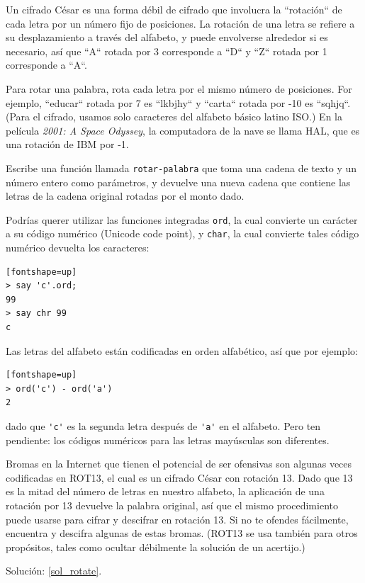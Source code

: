 \begin{exercise}

\label{rotate}
Un cifrado César es una forma débil de cifrado que involucra
la ``rotación`` de cada letra por un número fijo de posiciones.
La rotación de una letra se refiere a su desplazamiento a través
del alfabeto, y puede envolverse alrededor si es necesario, 
así que ``A`` rotada por 3 corresponde a ``D`` y ``Z`` rotada por
1 corresponde a ``A``.

Para rotar una palabra, rota cada letra por el mismo número de posiciones.
For ejemplo, ``educar`` rotada por 7 es ``lkbjhy`` y ``carta`` rotada por 
-10  es ``sqhjq``. (Para el cifrado, usamos solo caracteres del alfabeto
básico latino ISO.) En la película
{\em 2001: A Space Odyssey}, la computadora de la nave se llama 
HAL, que es una rotación de IBM por -1.

Escribe una función llamada \verb|rotar-palabra| que toma una cadena de texto
y un número entero como parámetros, y devuelve una nueva cadena que 
contiene las letras de la cadena original rotadas por el monto dado.


Podrías querer utilizar las funciones integradas {\tt ord}, 
la cual convierte un carácter a su código numérico (Unicode code point),
y {\tt char}, la cual convierte tales código numérico devuelta los
caracteres:

\begin{verbatim}[fontshape=up]
> say 'c'.ord;
99
> say chr 99
c
\end{verbatim}
%

Las letras del alfabeto están codificadas en orden 
alfabético, así que por ejemplo:

\begin{verbatim}[fontshape=up]
> ord('c') - ord('a')
2
\end{verbatim}

dado que \verb|'c'| es la segunda letra después de \verb|'a'|
en el alfabeto. Pero ten pendiente: los códigos numéricos para
las letras mayúsculas son diferentes.

Bromas en la Internet que tienen el potencial de ser ofensivas
son algunas veces codificadas en ROT13, el cual es un cifrado 
César con rotación 13. Dado que 13 es la mitad del número de letras
en nuestro alfabeto, la aplicación de una rotación por 13 devuelve la
palabra original, así que el mismo procedimiento puede usarse
para cifrar y descifrar en rotación 13. Si no te ofendes fácilmente,
encuentra y descifra algunas de estas bromas. (ROT13 se usa también 
para otros propósitos, tales como ocultar débilmente la solución de
un acertijo.)

Solución: \ref{sol_rotate}.

\end{exercise}

